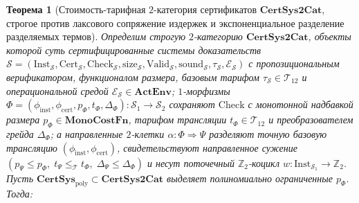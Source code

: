 \documentclass[11pt]{article}
\theoremstyle{plain}
\newtheorem{theorem}{Теорема}[section]
\theoremstyle{definition}
\begin{document}
\begin{theorem}[Стоимость-тарифная $2$-категория сертификатов $\mathbf{CertSys2Cat}$, строгое против лаксового сопряжение издержек и экспоненциальное разделение разделяемых термов]\label{thm:cert-sys-2cat-and-sharing}
Определим строгую $2$-категорию $\mathbf{CertSys2Cat}$, объекты которой суть сертифицированные системы доказательств $\mathcal{S} = (\mathrm{Inst}_{\mathcal{S}}, \mathrm{Cert}_{\mathcal{S}}, \mathrm{Check}_{\mathcal{S}}, \mathrm{size}_{\mathcal{S}}, \mathrm{Valid}_{\mathcal{S}}, \mathrm{sound}_{\mathcal{S}}, \tau_{\mathcal{S}}, \mathcal{E}_{\mathcal{S}})$ с пропозициональным верификатором, функционалом размера, базовым тарифом $\tau_{\mathcal{S}} \in \mathcal{T}_{12}$ и операциональной средой $\mathcal{E}_{\mathcal{S}} \in \mathbf{ActEnv}$; $1$-морфизмы $\Phi = (\phi_{\mathrm{inst}}, \phi_{\mathrm{cert}}, p_\Phi, t_\Phi, \Delta_\Phi) : \mathcal{S}_1 \to \mathcal{S}_2$ сохраняют $\mathrm{Check}$ с монотонной надбавкой размера $p_\Phi \in \mathbf{MonoCostFn}$, тарифом трансляции $t_\Phi \in \mathcal{T}_{12}$ и преобразователем грейда $\Delta_\Phi$; а направленные $2$-клетки $\alpha : \Phi \Rightarrow \Psi$ разделяют точную базовую трансляцию $(\phi_{\mathrm{inst}}, \phi_{\mathrm{cert}})$, свидетельствуют направленное сужение $(p_\Psi \le p_\Phi,\; t_\Psi \le_{\mathcal{T}} t_\Phi,\; \Delta_\Psi \le \Delta_\Phi)$ и несут поточечный $\mathbb{Z}_2$-коцикл $w : \mathrm{Inst}_{\mathcal{S}_1} \to \mathbb{Z}_2$. Пусть $\mathbf{CertSys}_{\mathrm{poly}} \subset \mathbf{CertSys2Cat}$ выделяет полиномиально ограниченные $p_\Phi$. Тогда:
\begin{enumerate}[nosep,label=(\roman*)]

\end{enumerate}
\end{theorem}
\end{document}
